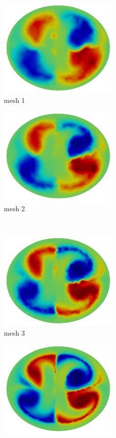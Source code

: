 \begin{figure}[htbp]
    \centering
    \begin{minipage}[c][2in][c]{0.4\linewidth}
        \centering
        \includegraphics[width=2.3in]{imgs/vena_cava/LNH_mesh1.png}\\
        mesh 1
    \end{minipage}
    \begin{minipage}[c][2in][c]{0.4\linewidth}
        \centering
        \includegraphics[width=2.3in]{imgs/vena_cava/LNH_mesh2_fixed.png}\\
        mesh 2
    \end{minipage}\\[.5\baselineskip]
    \begin{minipage}[c][2in][c]{0.4\linewidth}
        \centering
        \includegraphics[width=2.3in]{imgs/vena_cava/LNH_mesh3.png}\\
        mesh 3
    \end{minipage}
    \begin{minipage}[c][2in][c]{0.4\linewidth}
        \centering
        \includegraphics[width=2.3in]{imgs/vena_cava/LNH_mesh4_fixed.png}\\

\end{minipage}
\end{figure}

